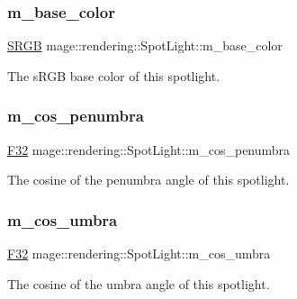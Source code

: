 \subsubsection{\texorpdfstring{m\+\_\+base\+\_\+color}{m\_base\_color}}
{\footnotesize\ttfamily \hyperlink{structmage_1_1_s_r_g_b}{S\+R\+GB} mage\+::rendering\+::\+Spot\+Light\+::m\+\_\+base\+\_\+color\hspace{0.3cm}{\ttfamily [private]}}

The s\+R\+GB base color of this spotlight. \hypertarget{classmage_1_1rendering_1_1_spot_light_afcac44663ee8e8773eaa838ddbf9c0f2}{}\label{classmage_1_1rendering_1_1_spot_light_afcac44663ee8e8773eaa838ddbf9c0f2} 
\subsubsection{\texorpdfstring{m\+\_\+cos\+\_\+penumbra}{m\_cos\_penumbra}}
{\footnotesize\ttfamily \hyperlink{namespacemage_aa97e833b45f06d60a0a9c4fc22ae02c0}{F32} mage\+::rendering\+::\+Spot\+Light\+::m\+\_\+cos\+\_\+penumbra\hspace{0.3cm}{\ttfamily [private]}}

The cosine of the penumbra angle of this spotlight. \hypertarget{classmage_1_1rendering_1_1_spot_light_a2152cbea4f216f8ae18550a8c9e5b5e0}{}\label{classmage_1_1rendering_1_1_spot_light_a2152cbea4f216f8ae18550a8c9e5b5e0} 
\subsubsection{\texorpdfstring{m\+\_\+cos\+\_\+umbra}{m\_cos\_umbra}}
{\footnotesize\ttfamily \hyperlink{namespacemage_aa97e833b45f06d60a0a9c4fc22ae02c0}{F32} mage\+::rendering\+::\+Spot\+Light\+::m\+\_\+cos\+\_\+umbra\hspace{0.3cm}{\ttfamily [private]}}

The cosine of the umbra angle of this spotlight. \hypertarget{classmage_1_1rendering_1_1_spot_light_af91b9fc5303e5c2c5e90337f42db015c}{}\label{classmage_1_1rendering_1_1_spot_light_af91b9fc5303e5c2c5e90337f42db015c} 
